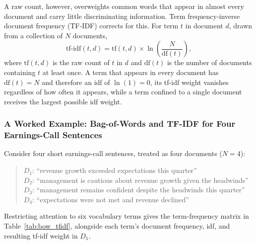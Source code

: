 \documentclass[../ai_in_finance]{subfiles}
\begin{document}
A raw count, however, overweights common words that appear in almost every document and carry little discriminating information. Term frequency-inverse document frequency (TF-IDF) corrects for this. For term $t$ in document $d$, drawn from a collection of $N$ documents,
\begin{equation*}
\text{tf-idf}(t,d) = \text{tf}(t,d) \times \ln\!\left(\frac{N}{\text{df}(t)}\right),
\end{equation*}
where $\text{tf}(t,d)$ is the raw count of $t$ in $d$ and $\text{df}(t)$ is the number of documents containing $t$ at least once. A term that appears in every document has $\text{df}(t)=N$ and therefore an idf of $\ln(1)=0$, its tf-idf weight vanishes regardless of how often it appears, while a term confined to a single document receives the largest possible idf weight.

\subsubsection*{A Worked Example: Bag-of-Words and TF-IDF for Four Earnings-Call Sentences}

Consider four short earnings-call sentences, treated as four documents ($N=4$):

\begin{quote}
\small
$D_1$: ``revenue growth exceeded expectations this quarter''\\
$D_2$: ``management is cautious about revenue growth given the headwinds''\\
$D_3$: ``management remains confident despite the headwinds this quarter''\\
$D_4$: ``expectations were not met and revenue declined''
\end{quote}

Restricting attention to six vocabulary terms gives the term-frequency matrix in Table~\ref{tab:bow_tfidf}, alongside each term's document frequency, idf, and resulting tf-idf weight in $D_1$.
\end{document}
